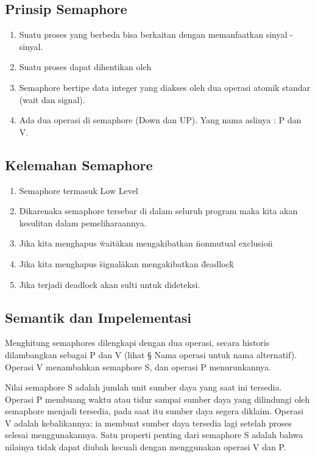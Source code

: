 	\subsection{Prinsip Semaphore}
	
		\begin{enumerate}

			\item Suatu proses yang berbeda bisa berkaitan dengan memanfaatkan sinyal - sinyal.
			\item Suatu proses dapat dihentikan oleh 
			\item Semaphore bertipe data integer yang diakses oleh dua operasi atomik standar (wait dan signal).
			\item Ada dua operasi di semaphore (Down dan UP). Yang nama aslinya : P dan V.
		
		\end{enumerate}

	\subsection{Kelemahan Semaphore}
	
		\begin{enumerate}

			\item Semaphore termasuk Low Level
			\item Dikarenaka semaphore tersebar di dalam seluruh program maka kita akan kesulitan dalam pemeliharaannya.
			\item Jika kita menghapus \"wait\" akan mengakibatkan \"nonmutual exclusion\"
			\item Jika kita menghapus \"signal\" akan mengakibatkan \"deadlock\"
			\item Jika terjadi deadlock akan sulti untuk dideteksi.

		\end{enumerate}
		
	\subsection{Semantik dan Impelementasi}
		Menghitung semaphores dilengkapi dengan dua operasi, secara historis dilambangkan sebagai P dan V (lihat § Nama operasi untuk nama alternatif). Operasi V menambahkan semaphore S, dan operasi P menurunkannya.

		Nilai semaphore S adalah jumlah unit sumber daya yang saat ini tersedia. Operasi P membuang waktu atau tidur sampai sumber daya yang dilindungi oleh semaphore menjadi tersedia, pada saat itu sumber daya segera diklaim. Operasi V adalah kebalikannya: ia membuat sumber daya tersedia lagi setelah proses selesai menggunakannya. Satu properti penting dari semaphore S adalah bahwa nilainya tidak dapat diubah kecuali dengan menggunakan operasi V dan P.

